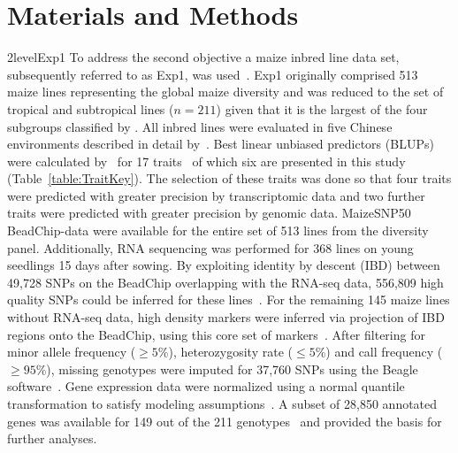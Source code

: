 \documentclass[12pt,titlepage]{article}
\begin{document}
\section{Materials and Methods}
\Genetics2level{Exp1}
To address the second objective a maize inbred line data set, subsequently
referred to as Exp1, was used~\cite{Yang2014}.
Exp1 originally comprised 513 maize lines representing the global maize
diversity  and was reduced to the set of tropical and subtropical lines
($n = 211$) given that it is the largest of the four subgroups classified by
.
All inbred lines were evaluated in five Chinese environments described in detail
by~.
Best linear unbiased predictors (BLUPs) were calculated by~ for
17 traits~\cite{Guo2016} of which six are presented in this study
(Table~\ref{table:TraitKey}).
The selection of these traits was done so that four traits were predicted with
greater precision by transcriptomic data and two further traits were predicted
with greater precision by genomic data.
MaizeSNP50 BeadChip-data were available for the entire set of 513 lines from the
diversity panel.
Additionally, RNA sequencing was performed for 368 lines on young seedlings 15 
days after sowing.
By exploiting identity by descent (IBD) between 49,728 SNPs on the BeadChip 
overlapping with the RNA-seq data, 556,809 high quality SNPs could be inferred 
for these lines~\cite{Fu2013,Li2013}.
For the remaining 145 maize lines without RNA-seq data, high density markers
were inferred via projection of IBD regions onto the BeadChip, using this core 
set of markers~\cite{Yang2014}.
After filtering for minor allele frequency ($\geq 5$\%), heterozygosity rate
($\leq 5$\%) and call frequency ($\geq 95$\%), missing genotypes were imputed 
for 37,760 SNPs using the Beagle software~\cite{Browning2009}.
Gene expression data were normalized using a normal quantile transformation to
satisfy modeling assumptions~\cite{Fu2013}.
A subset of 28,850 annotated genes was available for 149 out of the 211
genotypes~\cite{Fu2013} and provided the basis for further analyses.
\end{document}
